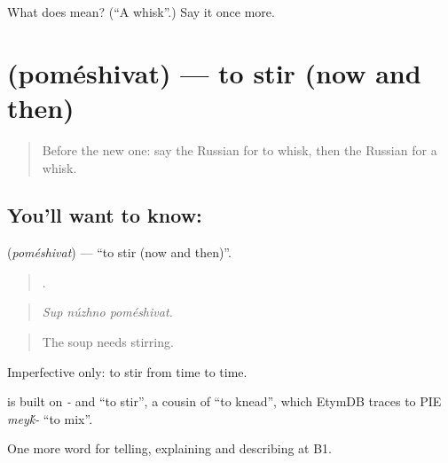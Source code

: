 \begin{tcolorbox}[breakable,colback=teal!4,colframe=teal!35!black,title={Before you move on}]
What does  mean? (\textquotedblleft{}A whisk\textquotedblright{}.) Say it once more.
\end{tcolorbox}
\section[\texorpdfstring{\ru{помешивать} (poméshivat)}{помешивать (poméshivat)}]{ (poméshivat) — to stir (now and then)}

\label{lesson:RU-C330-pomeshivat}



\begin{quote}
Before the new one: say the Russian for to whisk, then the Russian for a whisk.
\end{quote}

\subsection*{You'll want to know: }
\textbf{} (\emph{poméshivat}) — \textquotedblleft{}to stir (now and then)\textquotedblright{}.

\begin{quote}
  .
\end{quote}

\begin{quote}
\emph{Sup núzhno poméshivat.}
\end{quote}

\begin{quote}
The soup needs stirring.
\end{quote}

Imperfective only: to stir from time to time.

\begin{cousinweb}
\emph{} is built on \emph{-} and \emph{} \textquotedblleft{}to stir\textquotedblright{}, a cousin of \emph{} \textquotedblleft{}to knead\textquotedblright{}, which EtymDB traces to PIE \emph{mey\'{k}-} \textquotedblleft{}to mix\textquotedblright{}.
\end{cousinweb}

\begin{grammarlens}[title={What you've built}]
One more word for telling, explaining and describing at B1.
\end{grammarlens}

